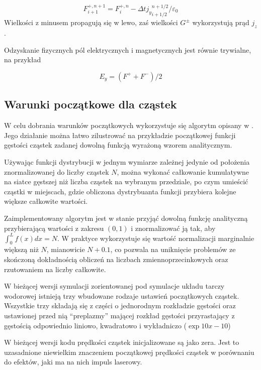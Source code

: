 \begin{equation}
    {F}^{+,n+1}_{i+1} = F^{+,n}_i - \Delta t {j_y}_{i+1/2}^{n+1/2} / \varepsilon_0
\end{equation}
Wielkości z minusem propagują się w lewo, zaś wielkości $G^\pm$ wykorzystują prąd $j_z$.


Odzyskanie fizycznych pól elektrycznych i magnetycznych jest równie trywialne, na przykład 

\begin{equation}
E_y = \left( F^+ + F^- \right)/2
\end{equation}


\subsection{Warunki początkowe dla cząstek}

W celu dobrania warunków początkowych wykorzystuje się algorytm opisany w
\cite{birdsall}. Jego działanie można łatwo zilustrować na
przykładzie początkowej funkcji gęstości cząstek zadanej dowolną funkcją
wyrażoną wzorem analitycznym.

Używając funkcji dystrybucji w jednym wymiarze zależnej jedynie od
położenia znormalizowanej do liczby cząstek $N$, można wykonać całkowanie
kumulatywne na siatce gęstszej niż liczba cząstek na wybranym przedziale,
po czym umieścić cząstki w miejscach, gdzie obliczona dystrybuanta funkcji
 przybiera kolejne większe całkowite wartości.


Zaimplementowany algorytm jest w stanie przyjąć dowolną funkcję analityczną
przybierającą  wartości z zakresu $(0, 1)$
i znormalizować ją tak, aby $\int_0^L
f(x) dx = N$. W praktyce wykorzystuje się wartość normalizacji marginalnie
większą niż $N$, mianowicie $N+0.1$, co pozwala na uniknięcie problemów ze
skończoną dokładnością obliczeń na liczbach zmiennoprzecinkowych oraz
rzutowaniem na liczby całkowite.

W bieżącej wersji symulacji zorientowanej pod symulacje układu tarczy
wodorowej istnieją trzy wbudowane rodzaje ustawień początkowych cząstek.
Wszystkie trzy składają się z części o jednorodnym rozkładzie gęstości oraz
ustawionej przed nią ``preplazmy'' mającej rozkład gęstości przyrastający z
gęstością odpowiednio liniowo, kwadratowo i wykładniczo ($\exp{10 x - 10}$)


W bieżącej wersji kodu prędkości cząstek inicjalizowane są jako zera. Jest to
uzasadnione niewielkim znaczeniem początkowej prędkości cząstek w
porównaniu do efektów, jaki ma na nich impuls laserowy.

